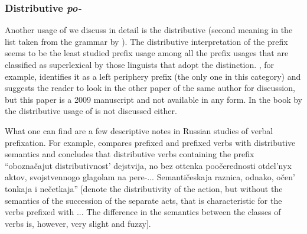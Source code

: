 
\subsubsection{Distributive \textit{po-}}

Another usage of  we discuss in detail is the distributive (second meaning in the list taken from the grammar by \citealt{Shvedova:82}). The distributive interpretation of the prefix  seems to be the least studied prefix usage among all the prefix usages that are classified as superlexical by those linguists that adopt the distinction. \citet{Tatevosov:09}, for example, identifies it as a left periphery prefix (the only one in this category) and suggests the reader to look in the other paper of the same author for discussion, but this paper is a 2009 manuscript and not available in any form. In the book by \citet{Kagan:book} the distributive usage of  is not discussed either. 

What one can find are a few descriptive notes in Russian studies of verbal prefixation. For example, \citet[289--290]{Isachenko:60} compares prefixed and prefixed verbs with distributive semantics and concludes that distributive verbs containing the prefix  ``obozna\v{c}ajut distributivnost' dejstvija, no bez ottenka poo\v{c}erednosti otdel'nyx aktov, svojstvennogo glagolam na pere-... Semanti\v{c}eskaja raznica, odnako, o\v{c}en' tonkaja i ne\v{c}etkaja'' [denote the distributivity of the action, but without the semantics of the succession of the separate acts, that is characteristic for the verbs prefixed with ... The difference in the semantics between the classes of verbs is, however, very slight and fuzzy].


